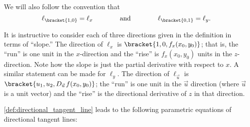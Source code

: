 We will also follow the convention that
\[
\ell_{\bracket{1,0}}=\ell_x
\qquad\qquad\text{and}\qquad\qquad
\ell_{\bracket{0,1}}=\ell_y.
\]

It is instructive to consider each of three directions given in the definition in terms of ``slope.'' The direction of $\ell_x$ is $\bracket{1,0,f_x(x_0,y_0)}$; that is, the ``run'' is one unit in the $x$-direction and the ``rise'' is $f_x(x_0,y_0)$ units in the $z$-direction. Note how the slope is just the partial derivative with respect to $x$. A similar statement can be made for $\ell_y$. The direction of $\ell_{\vec u}$ is $\bracket{u_1,u_2,D_{\vec u\,}f(x_0,y_0)}$; the ``run'' is one unit in the $\vec u$ direction (where $\vec u$ is a unit vector) and the ``rise'' is the directional derivative of $z$ in that direction.


\autoref{def:directional_tangent_line} leads to the following parametric equations of directional tangent lines:


